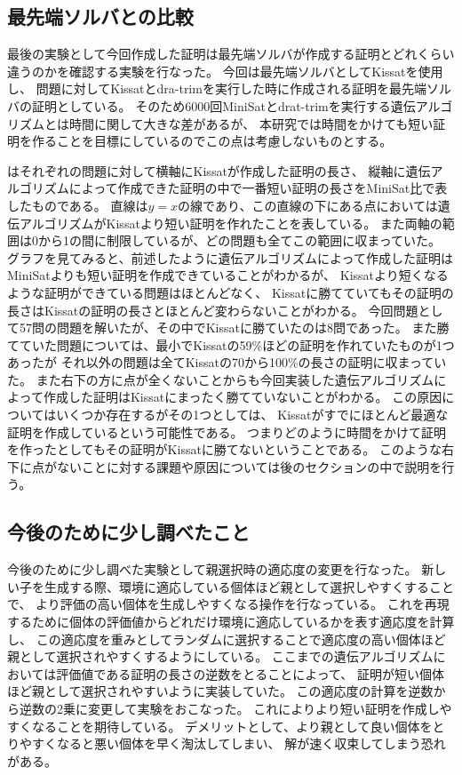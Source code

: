 \subsection{最先端ソルバとの比較}

最後の実験として今回作成した証明は最先端ソルバが作成する証明とどれくらい違うのかを確認する実験を行なった。
今回は最先端ソルバとしてKissatを使用し、
問題に対してKissatとdra-trimを実行した時に作成される証明を最先端ソルバの証明としている。
そのため6000回MiniSatとdrat-trimを実行する遺伝アルゴリズムとは時間に関して大きな差があるが、
本研究では時間をかけても短い証明を作ることを目標にしているのでこの点は考慮しないものとする。


はそれぞれの問題に対して横軸にKissatが作成した証明の長さ、
縦軸に遺伝アルゴリズムによって作成できた証明の中で一番短い証明の長さをMiniSat比で表したものである。
直線は$y=x$の線であり、この直線の下にある点においては遺伝アルゴリズムがKissatより短い証明を作れたことを表している。
また両軸の範囲は0から1の間に制限しているが、どの問題も全てこの範囲に収まっていた。
グラフを見てみると、前述したように遺伝アルゴリズムによって作成した証明はMiniSatよりも短い証明を作成できていることがわかるが、
Kissatより短くなるような証明ができている問題はほとんどなく、
Kissatに勝てていてもその証明の長さはKissatの証明の長さとほとんど変わらないことがわかる。
今回問題として57問の問題を解いたが、その中でKissatに勝ていたのは8問であった。
また勝てていた問題については、最小でKissatの59\%ほどの証明を作れていたものが1つあったが
それ以外の問題は全てKissatの70から100\%の長さの証明に収まっていた。
また右下の方に点が全くないことからも今回実装した遺伝アルゴリズムによって作成した証明はKissatにまったく勝てていないことがわかる。
この原因についてはいくつか存在するがその1つとしては、
Kissatがすでにほとんど最適な証明を作成しているという可能性である。
つまりどのように時間をかけて証明を作ったとしてもその証明がKissatに勝てないということである。
このような右下に点がないことに対する課題や原因については後のセクションの中で説明を行う。

\subsection{今後のために少し調べたこと}

今後のために少し調べた実験として親選択時の適応度の変更を行なった。
新しい子を生成する際、環境に適応している個体ほど親として選択しやすくすることで、
より評価の高い個体を生成しやすくなる操作を行なっている。
これを再現するために個体の評価値からどれだけ環境に適応しているかを表す適応度を計算し、
この適応度を重みとしてランダムに選択することで適応度の高い個体ほど親として選択されやすくするようにしている。
ここまでの遺伝アルゴリズムにおいては評価値である証明の長さの逆数をとることによって、
証明が短い個体ほど親として選択されやすいように実装していた。
この適応度の計算を逆数から逆数の2乗に変更して実験をおこなった。
これによりより短い証明を作成しやすくなることを期待している。
デメリットとして、より親として良い個体をとりやすくなると悪い個体を早く淘汰してしまい、
解が速く収束してしまう恐れがある。

